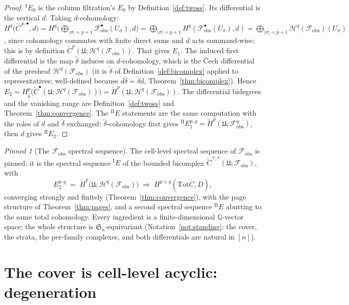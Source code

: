 \documentclass[11pt,oneside]{amsart}
\theoremstyle{plain}
\theoremstyle{definition}
\theoremstyle{remark}
\theoremstyle{honeststyle}
\newtheorem{pinned}[theorem]{Pinned}
\newcommand{\Sym}{\mathfrak{S}}
\newcommand{\Q}{\mathbb{Q}}
\newcommand{\Tot}{\mathrm{Tot}}
\newcommand{\fobs}{\mathcal{F}_{\mathrm{obs}}}
\newcommand{\Uf}{\mathfrak{U}}
\newcommand{\Ccheck}{\check{C}}
\begin{document}
\begin{proof}
${}^{\mathrm{I}}E_{0}$ is the column filtration's $E_{0}$ by
Definition~\ref{def:twoss}. Its differential is the vertical $d$.
Taking $d$-cohomology: $H^{q}\bigl(\Ccheck^{\,p,\bullet},d\bigr)
=H^{q}\bigl(\bigoplus_{|\sigma|=p+1}\fobs^{\bullet}(U_{\sigma}),d
\bigr)=\bigoplus_{|\sigma|=p+1}H^{q}(\fobs^{\bullet}(U_{\sigma}),d)
=\bigoplus_{|\sigma|=p+1}\mathcal H^{q}(\fobs)(U_{\sigma})$, since
cohomology commutes with finite direct sums and $d$ acts summand-wise;
this is by definition $\check C^{p}(\Uf;\mathcal H^{q}(\fobs))$. That
gives $E_{1}$. The induced first differential is the map $\check\delta$
induces on $d$-cohomology, which is the \v{C}ech differential of the
presheaf $\mathcal H^{q}(\fobs)$ (it is $\check\delta$ of
Definition~\ref{def:bicomplex} applied to representatives;
well-defined because $d\check\delta=\check\delta d$,
Theorem~\ref{thm:bicomplex}). Hence $E_{2}=H^{p}_{\check\delta}\bigl(
\check C^{\bullet}(\Uf;\mathcal H^{q}(\fobs))\bigr)=\check H^{p}(\Uf;
\mathcal H^{q}(\fobs))$. The differential bidegrees and the vanishing
range are Definition~\ref{def:twoss} and Theorem~\ref{thm:convergence}.
The ${}^{\mathrm{II}}E$ statements are the same computation with the
roles of $d$ and $\check\delta$ exchanged: $\check\delta$-cohomology
first gives ${}^{\mathrm{II}}E_{1}^{p,q}=\check H^{p}(\Uf;\fobs^{q})$,
then $d$ gives ${}^{\mathrm{II}}E_{2}$.
\end{proof}

\begin{pinned}[The $\fobs$ spectral sequence]
\label{pin:ss}
The cell-level spectral sequence of $\fobs$ is pinned: it is the
spectral sequence ${}^{\mathrm{I}}E$ of the bounded bicomplex
$\Ccheck^{\,*,*}(\Uf;\fobs)$, with
\[
  E_{2}^{p,q}\;=\;\check H^{p}\bigl(\Uf;\mathcal H^{q}(\fobs)\bigr)
  \;\Longrightarrow\;H^{p+q}(\Tot\Ccheck,D),
\]
converging strongly and finitely (Theorem~\ref{thm:convergence}),
with the page structure of Theorem~\ref{thm:pages}, and a second
spectral sequence ${}^{\mathrm{II}}E$ abutting to the same total
cohomology. Every ingredient is a finite-dimensional $\Q$-vector
space; the whole structure is $\Sym_{n}$-equivariant
(Notation~\ref{not:standing}: the cover, the strata, the per-family
complexes, and both differentials are natural in $[n]$).
\end{pinned}

\section{The cover is cell-level acyclic: degeneration}
\label{sec:degeneration}
\end{document}
